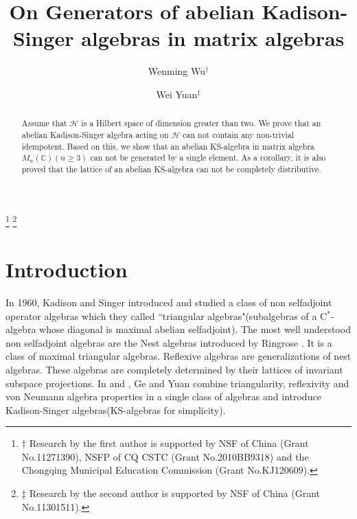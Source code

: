 \documentclass[a4paper,10pt]{amsart}
\theoremstyle{refs}
\newcommand{\HHH}{\mathcal H} %
\begin{document}
\title{\textbf{On Generators of abelian Kadison-Singer algebras in matrix
algebras}}

\author{Wenming Wu$^{\dagger}$}
\address{College of Mathematical Sciences, Chongqing Normal University,
Chongqing, 400047, China}

\author{Wei Yuan$^{\ddagger}$}
\address{Academy of Mathematics and Systems Science, Chinese Academy of Science,
Beijing, 100190, China}
\date{}

\begin{abstract}
Assume that $\HHH$ is a Hilbert space of dimension greater than two.
We prove that an abelian Kadison-Singer algebra acting on $\HHH$ can not
contain any non-trivial idempotent. Based on this, we show that
an abelian KS-algebra in matrix algebra $M_n(\mathbb{C})(n\geq3)$
can not be generated by a single
element. As a corollary, it is also proved that the lattice of an
abelian KS-algebra can not be completely distributive.
\end{abstract}



\thanks{$\dagger$ Research by the first author is supported by
    NSF of China (Grant No.11271390), NSFP of CQ CSTC
    (Grant No.2010BB9318) and
    the Chongqing Municipal Education Commission (Grant No.KJ120609).}
\thanks{
    $\ddagger$ Research by the second author is supported by NSF
    of China (Grant No.11301511).
}

\maketitle

\section{Introduction}
In 1960, Kadison and Singer introduced and studied a class of non
selfadjoint operator algebras which they called
``triangular algebras"(subalgebras of a
C$^*$-algebra whose diagonal is maximal abelian selfadjoint)\cite{KS}.
The most well understood non selfadjoint algebras are the Nest
algebras introduced by Ringrose \cite{R1}. It is a class of maximal
triangular algebras.
Reflexive algebras are generalizations of nest algebras.
These algebras are completely determined by their lattices of
invariant subspace projections.
In \cite{GY1} and \cite{GY2}, Ge and Yuan combine triangularity,
reflexivity and von Neumann algebra properties in a single class of algebras
and introduce Kadison-Singer algebras(KS-algebras for simplicity).
\end{document}
